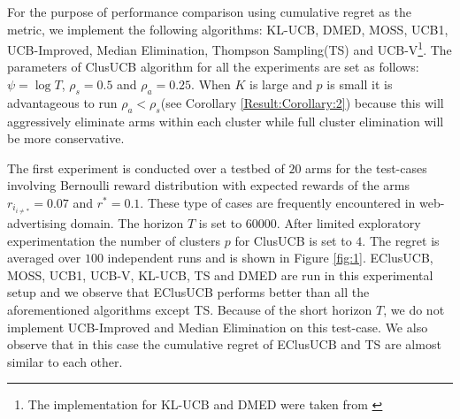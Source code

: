 For the purpose of performance comparison using cumulative regret as the metric, we implement the following algorithms:  KL-UCB\cite{garivier2011kl}, DMED\cite{honda2010asymptotically}, MOSS\cite{audibert2009minimax}, UCB1\cite{auer2002finite}, UCB-Improved\cite{auer2010ucb}, Median Elimination\cite{even2006action}, Thompson Sampling(TS)\cite{agrawal2011analysis} and UCB-V\cite{audibert2009exploration}\footnote{The implementation for KL-UCB and DMED were taken from \cite{CapGarKau12}}. The parameters of ClusUCB algorithm for all the experiments are set as follows: $\psi=\log T$, $\rho_{s}=0.5$ and $\rho_{a}=0.25$. When $K$ is large and $p$ is small it is advantageous to run $\rho_{a} < \rho_{s}$(see 
Corollary \ref{Result:Corollary:2}) because this will aggressively eliminate arms within each cluster while full cluster elimination will be more conservative.

The first experiment is conducted over a testbed of $20$ arms for the test-cases involving Bernoulli reward distribution with expected rewards of the arms $r_{i_{{i}\neq {*}}}=0.07$ and $r^{*}=0.1$. These type of cases are frequently encountered in web-advertising domain. The horizon $T$ is set to $60000$. After limited exploratory experimentation the number of clusters $p$ for ClusUCB is set to $4$. The regret is averaged over $100$ independent runs and is shown in Figure \ref{fig:1}. EClusUCB, MOSS, UCB1, UCB-V, KL-UCB, TS and DMED are run in this experimental setup and we observe that EClusUCB performs better than all the aforementioned algorithms except TS. Because of the short horizon $T$, we do not implement UCB-Improved and Median Elimination on this test-case. We also observe that in this case the cumulative regret of EClusUCB and TS are almost similar to each other.

